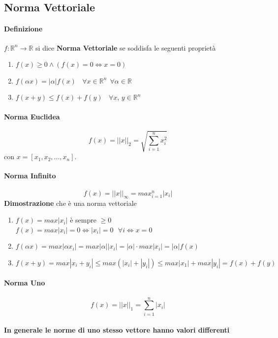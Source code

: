 \documentclass[10pt]{book}
\begin{document}
\subsection{Norma Vettoriale}
\paragraph{Definizione} $f: \mathbb{R}^n \rightarrow \mathbb{R}$ si dice \textbf{Norma Vettoriale} se soddisfa le seguenti proprietà
\begin{enumerate}
	\item $f(x) \geq 0 \wedge (f(x) = 0 \Leftrightarrow x = 0)$
	\item $f(\alpha x) = |\alpha|f(x)\:\:\:\:\forall x \in \mathbb{R}^n\:\:\forall\alpha\in \mathbb{R}$
	\item $f(x + y) \leq f(x) + f(y)\:\:\:\:\forall x$, $y \in \mathbb{R}^n$
\end{enumerate}
\pagebreak
\paragraph{Norma Euclidea} $$f(x) = ||x||_2 = \sqrt{\sum_{i = 1}^n x_i^2}$$ con $x = \left[x_1, x_2, \ldots, x_n\right]$.
\paragraph{Norma Infinito} $$f(x) = ||x||_\infty = max_{i = 1}^n |x_i|$$
\textbf{Dimostrazione} che è una norma vettoriale
\begin{enumerate}
	\item $f(x) = max |x_i|$ è sempre $\geq 0$\\
	$f(x) = max |x_i| = 0 \Leftrightarrow |x_i| = 0\:\:\:\forall i \Leftrightarrow x = 0$
	\item $f(\alpha x) = max |\alpha x_i| = max |\alpha||x_i| = |\alpha|\cdot max |x_i| = |\alpha|f(x)$
	\item $f(x + y) = max |x_i + y_i| \leq max(|x_i| + |y_i|) \leq max|x_1| + max|y_i| = f(x) + f(y)$
\end{enumerate}
\paragraph{Norma Uno} $$f(x) = ||x||_1 = \sum_{i = 1}^n |x_i|$$
\paragraph{In generale le norme di uno stesso vettore hanno valori differenti}
\end{document}
